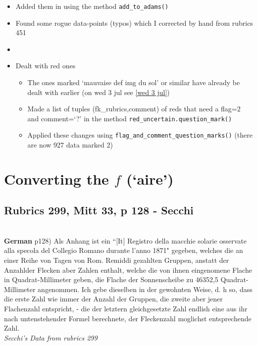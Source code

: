 \documentclass[12pt]{article}
\begin{document}
\begin{itemize}
    \item Added them in using the method \texttt{add\_to\_adams()}
    \item Found some rogue data-points (typos) which I corrected by hand from rubrics 451
    \item 
    \item Dealt with red ones
    \begin{itemize}
        \item The ones marked `mauvaise def img du sol' or similar have already be dealt with earlier (on wed 3 jul see \ref{wed 3 jul})
        \item Made a list of tuples (fk\_rubrics,comment) of reds that need a flag=2 and comment=`?' in the method \texttt{red\_uncertain.question\_mark()}
        \item Applied these changes using \texttt{flag\_and\_comment\_question\_marks()} (there are now 927 data marked 2)
    \end{itemize}
\end{itemize}




\section{Converting the $f$ (`aire')}\label{converting the `aire'}

\subsection{Rubrics 299, Mitt 33, p 128 - Secchi}\label{rubrics 299, secchi}\\

\textbf{German}
p128) Als Anhang ist ein ``[It] Registro della macchie solarie osservate alla specola del Collegio Romano durante l'anno 1871" gegeben, welches die an einer Reihe von Tagen von Rom. Remiddi gezahlten Gruppen, anstatt der Anzahlder Flecken aber Zahlen enthalt, welche die von ihnen eingenomene Flache in Quadrat-Millimeter geben, die Flache der Sonnenscheibe zu 46352,5 Quadrat-Millimeter angenommen. Ich gebe dieselben in der gewohnten Weise, d. h so, dass die erste Zahl wie immer der Anzahl der Gruppen, die zweite aber jener Flachenzahl entspricht, - die der letztern gleichgesetzte Zahl endlish eine aus ihr nach untenstehender Formel berechnete, der Fleckenzahl moglichst entsprechende Zahl.\\

\textit{Secchi's Data from rubrics 299}\\
\end{document}

